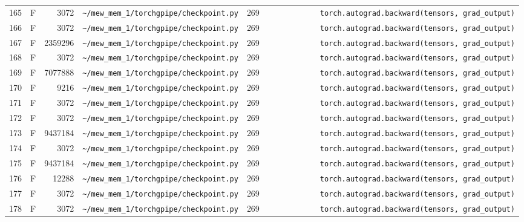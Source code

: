 \documentclass{article}
\begin{document}
\begin{longtable}{r l r p{6.5cm} r p{7.0cm}}
165 & F & 3072 & \lstinline|~/mew_mem_1/torchgpipe/checkpoint.py| & 269 & \lstinline|            torch.autograd.backward(tensors, grad_output)| \\
166 & F & 3072 & \lstinline|~/mew_mem_1/torchgpipe/checkpoint.py| & 269 & \lstinline|            torch.autograd.backward(tensors, grad_output)| \\
167 & F & 2359296 & \lstinline|~/mew_mem_1/torchgpipe/checkpoint.py| & 269 & \lstinline|            torch.autograd.backward(tensors, grad_output)| \\
168 & F & 3072 & \lstinline|~/mew_mem_1/torchgpipe/checkpoint.py| & 269 & \lstinline|            torch.autograd.backward(tensors, grad_output)| \\
169 & F & 7077888 & \lstinline|~/mew_mem_1/torchgpipe/checkpoint.py| & 269 & \lstinline|            torch.autograd.backward(tensors, grad_output)| \\
170 & F & 9216 & \lstinline|~/mew_mem_1/torchgpipe/checkpoint.py| & 269 & \lstinline|            torch.autograd.backward(tensors, grad_output)| \\
171 & F & 3072 & \lstinline|~/mew_mem_1/torchgpipe/checkpoint.py| & 269 & \lstinline|            torch.autograd.backward(tensors, grad_output)| \\
172 & F & 3072 & \lstinline|~/mew_mem_1/torchgpipe/checkpoint.py| & 269 & \lstinline|            torch.autograd.backward(tensors, grad_output)| \\
173 & F & 9437184 & \lstinline|~/mew_mem_1/torchgpipe/checkpoint.py| & 269 & \lstinline|            torch.autograd.backward(tensors, grad_output)| \\
174 & F & 3072 & \lstinline|~/mew_mem_1/torchgpipe/checkpoint.py| & 269 & \lstinline|            torch.autograd.backward(tensors, grad_output)| \\
175 & F & 9437184 & \lstinline|~/mew_mem_1/torchgpipe/checkpoint.py| & 269 & \lstinline|            torch.autograd.backward(tensors, grad_output)| \\
176 & F & 12288 & \lstinline|~/mew_mem_1/torchgpipe/checkpoint.py| & 269 & \lstinline|            torch.autograd.backward(tensors, grad_output)| \\
177 & F & 3072 & \lstinline|~/mew_mem_1/torchgpipe/checkpoint.py| & 269 & \lstinline|            torch.autograd.backward(tensors, grad_output)| \\
178 & F & 3072 & \lstinline|~/mew_mem_1/torchgpipe/checkpoint.py| & 269 & \lstinline|            torch.autograd.backward(tensors, grad_output)| \\

\end{longtable}
\end{document}
